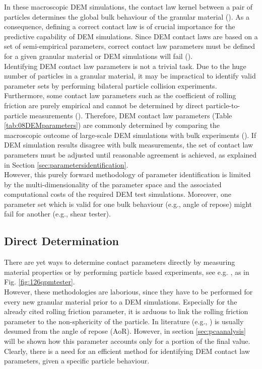 In these macroscopic \acs{DEM} simulations, the contact law kernel between a 
pair of particles determines the global bulk behaviour of the granular material
(\citet{RefWorks:131}).
As a consequence, defining a correct contact law is of crucial importance for the predictive 
capability of \acs{DEM} simulations. 
Since \acs{DEM} contact laws are based 
on a set of semi-empirical parameters, correct contact law 
parameters must be defined for a given granular material
or \acs{DEM} simulations will fail (\citet{RefWorks:177}). \\
Identifying \acs{DEM} contact law parameters is not a trivial task. 
Due to the huge number of particles in a granular material, it
may be impractical to identify valid parameter sets by performing bilateral 
particle collision experiments. 
Furthermore, some contact law parameters such as the coefficient of rolling
friction are purely empirical and cannot be determined by direct 
particle-to-particle measurements (\citet{RefWorks:87}).
Therefore, \acs{DEM} contact law parameters (Table \ref{tab:08DEMparameters}) are
commonly determined by comparing the macroscopic outcome of large-scale \acs{DEM}
simulations with bulk experiments (\citet{RefWorks:91}). 
If \acs{DEM} simulation results disagree with bulk measurements, the set of contact
law parameters must be adjusted until reasonable agreement is achieved, as
explained in Section \ref{sec:parametersidentification}.\\
However, this purely forward methodology of parameter identification is limited by 
the multi-dimensionality of the parameter space and the associated computational costs of the required 
\acs{DEM} test simulations. 
Moreover, one parameter set which is valid for one bulk behaviour (e.g., angle
of repose) might fail for another (e.g., shear tester). \\

\subsection{Direct Determination}
\label{subsec:directdetermination}


There are yet ways to determine contact parameters directly by measuring
material properties or by performing particle based experiments, see e.g.
\citet{RefWorks:177, RefWorks:181, RefWorks:186}, as in
Fig. \ref{fig:126qpmtester}.\\
However, these methodologies are laborious, 
since they have to be performed for every new granular material prior to a \acs{DEM}
simulations. 
Especially for the already cited rolling friction parameter, it is arduous to
link the rolling friction parameter to the non-sphericity of the particle.
In literature (e.g., \citet{RefWorks:177}) is usually desumed from the angle of
repose (\acs{AoR}).
However, in section \ref{sec:pcaanalysis} will be shown how this parameter
accounts only for a portion of the final value.\\
Clearly, there is a
need for an efficient method for identifying \acs{DEM} contact law parameters, given
a specific particle behaviour.



